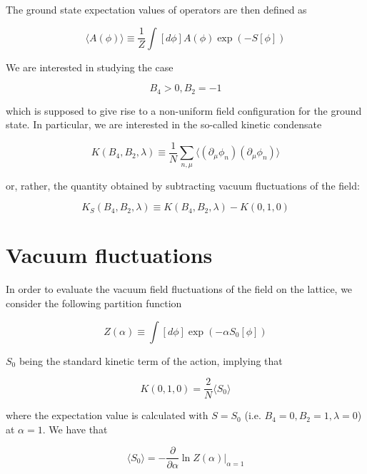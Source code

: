 \documentclass{article}
\begin{document}
\noindent The ground state expectation values of operators are then defined as

\begin{equation}
\langle A(\phi) \rangle \equiv \frac{1}{Z} \int [d\phi] A(\phi) \exp\left( -S[\phi]\right)
\end{equation}

\noindent We are interested in studying the case

\begin{equation}
B_4 > 0, B_2 = -1
\end{equation}

\noindent which is supposed to give rise to a non-uniform field configuration for the ground state.
In particular, we are interested in the so-called kinetic condensate

\begin{equation}
K(B_4, B_2, \lambda) \equiv \frac{1}{N}\sum_{n, \mu} \langle (\partial_\mu \phi_n)(\partial_\mu \phi_n) \rangle
\end{equation}

\noindent or, rather, the quantity obtained by subtracting vacuum fluctuations of the field:

\begin{equation}
K_S(B_4, B_2, \lambda) \equiv K(B_4, B_2, \lambda) - K(0, 1, 0)
\end{equation}

\section{Vacuum fluctuations}

In order to evaluate the vacuum field fluctuations of the field on the lattice, we consider the following partition function

\begin{equation}
Z(\alpha) \equiv \int [d\phi] \exp(-\alpha S_0[\phi])
\end{equation}

\noindent $S_0$ being the standard kinetic term of the action, implying that

\begin{equation}
K(0,1,0) = \frac{2}{N} \langle S_0 \rangle
\end{equation}

\noindent where the expectation value is calculated with $S=S_0$ (i.e. $B_4=0, B_2=1, \lambda=0$) at $\alpha=1$. We have that

\begin{equation}
\langle S_0 \rangle = -\frac{\partial}{\partial \alpha} \ln Z(\alpha) \Bigr|_{\alpha = 1}
\end{equation}
\end{document}
